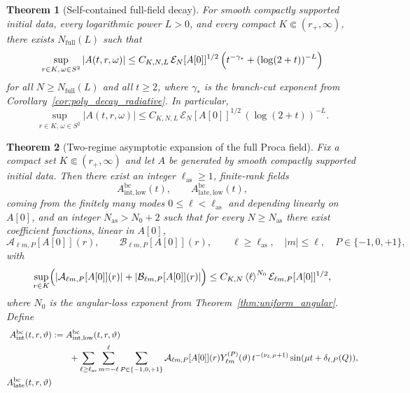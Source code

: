 \documentclass[12pt]{article}
\numberwithin{equation}{section}
\theoremstyle{plain}
\newtheorem{theorem}{Theorem}[section]
\theoremstyle{definition}
\theoremstyle{remark}
\newcommand{\bc}{\mathrm{bc}}
\newcommand{\angles}[1]{\left\langle #1 \right\rangle}
\newcommand{\abs}[1]{\left|#1\right|}
\begin{document}
\begin{theorem}[Self-contained full-field decay]\label{thm:full_field_unsplit}
For smooth compactly supported initial data, every logarithmic power $L>0$, and every compact $K\Subset(r_+,\infty)$, there exists $N_{\mathrm{full}}(L)$ such that
\[
   \sup_{r\in K,\,\omega\in S^2}\abs{A(t,r,\omega)}
   \le
   C_{K,N,L}\,\mathcal E_N[A[0]]^{1/2}\,
   \Bigl(t^{-\gamma_*}+(\log(2+t))^{-L}\Bigr)
\]
for all $N\ge N_{\mathrm{full}}(L)$ and all $t\ge2$, where $\gamma_*$ is the branch-cut exponent from Corollary~\ref{cor:poly_decay_radiative}.  In particular,
\[
   \sup_{r\in K,\,\omega\in S^2}\abs{A(t,r,\omega)}
   \le
   C_{K,N,L}\,\mathcal E_N[A[0]]^{1/2}\,(\log(2+t))^{-L}.
\]
\end{theorem}

\begin{theorem}[Two-regime asymptotic expansion of the full Proca field]\label{thm:full_field_asymptotic_expansion}
Fix a compact set $K\Subset(r_+,\infty)$ and let $A$ be generated by smooth compactly supported initial data.  Then there exist an integer $\ell_{\mathrm{as}}\ge1$, finite-rank fields
\[
   A^{\bc}_{\mathrm{int,low}}(t),
   \qquad
   A^{\bc}_{\mathrm{late,low}}(t),
\]
coming from the finitely many modes $0\le\ell<\ell_{\mathrm{as}}$ and depending linearly on $A[0]$, and an integer $N_{\mathrm{as}}>N_0+2$ such that for every $N\ge N_{\mathrm{as}}$ there exist coefficient functions, linear in $A[0]$,
\[
   \mathcal A_{\ell m,P}[A[0]](r),
   \qquad
   \mathcal B_{\ell m,P}[A[0]](r),
   \qquad
   \ell\ge\ell_{\mathrm{as}},\quad |m|\le\ell,\quad P\in\{-1,0,+1\},
\]
with
\begin{equation}\label{eq:intro_asymptotic_coeff_bounds}
   \sup_{r\in K}
   \Bigl(
      \abs{\mathcal A_{\ell m,P}[A[0]](r)}
      +
      \abs{\mathcal B_{\ell m,P}[A[0]](r)}
   \Bigr)
   \le
   C_{K,N}\angles{\ell}^{N_0}\mathcal E_{\ell m,P}[A[0]]^{1/2},
\end{equation}
where $N_0$ is the angular-loss exponent from Theorem~\ref{thm:uniform_angular}.  Define
\begin{align}
   A^{\bc}_{\mathrm{int}}(t,r,\vartheta)
   &:=
   A^{\bc}_{\mathrm{int,low}}(t,r,\vartheta)
   \notag\\
   &\qquad+
   \sum_{\ell\ge\ell_{\mathrm{as}}}\sum_{m=-\ell}^{\ell}\sum_{P\in\{-1,0,+1\}}
   \mathcal A_{\ell m,P}[A[0]](r)
   Y^{(P)}_{\ell m}(\vartheta)
   \,t^{-(\nu_{\ell,P}+1)}
   \sin(\mu t+\delta_{\ell,P}(Q)),
   \label{eq:intro_full_intermediate_profile}
   \\
   A^{\bc}_{\mathrm{late}}(t,r,\vartheta)

\end{align}
\end{theorem}
\end{document}
